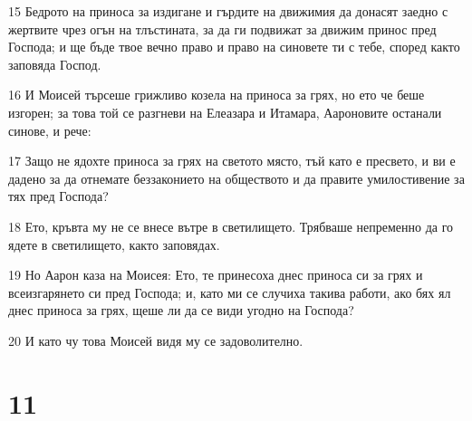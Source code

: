 \par 15 Бедрото на приноса за издигане и гърдите на движимия да донасят заедно с жертвите чрез огън на тлъстината, за да ги подвижат за движим принос пред Господа; и ще бъде твое вечно право и право на синовете ти с тебе, според както заповяда Господ.
\par 16 И Моисей търсеше грижливо козела на приноса за грях, но ето че беше изгорен; за това той се разгневи на Елеазара и Итамара, Аароновите останали синове, и рече:
\par 17 Защо не ядохте приноса за грях на светото място, тъй като е пресвето, и ви е дадено за да отнемате беззаконието на обществото и да правите умилостивение за тях пред Господа?
\par 18 Ето, кръвта му не се внесе вътре в светилището. Трябваше непременно да го ядете в светилището, както заповядах.
\par 19 Но Аарон каза на Моисея: Ето, те принесоха днес приноса си за грях и всеизгарянето си пред Господа; и, като ми се случиха такива работи, ако бях ял днес приноса за грях, щеше ли да се види угодно на Господа?
\par 20 И като чу това Моисей видя му се задоволително.

\chapter{11}

